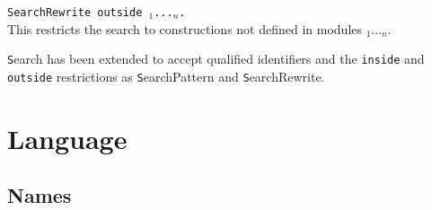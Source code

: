 \documentclass[11pt]{article}
\begin{document}
\begin{description}
\begin{Variants}
\item {\tt SearchRewrite {\term} outside {\module$_1$}...{\module$_n$}.}\\
  This restricts the search to constructions not defined in modules {\module$_1$}...{\module$_n$}.

\end{Variants}

\item {\texttt Search {\ident}} has been extended to accept qualified
identifiers and the {\tt inside} and {\tt outside} restrictions as
{\texttt SearchPattern} and {\texttt SearchRewrite}.

\end{description}

\section{Language}
\label{Language}

\subsection{Names}
\end{document}
